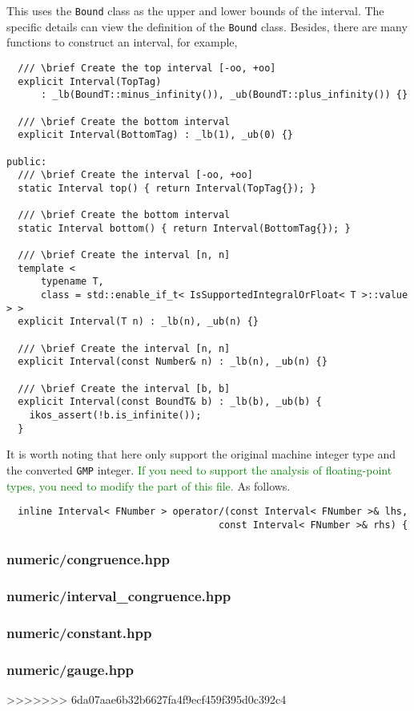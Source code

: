 \documentclass[12pt]{article}
\begin{document}
This uses the \texttt{Bound} class as the upper and lower bounds of the interval. The specific details can view the definition of the \texttt{Bound} class. Besides, there are many functions to construct an interval, for example,
\begin{lstlisting}
  /// \brief Create the top interval [-oo, +oo]
  explicit Interval(TopTag)
      : _lb(BoundT::minus_infinity()), _ub(BoundT::plus_infinity()) {}

  /// \brief Create the bottom interval
  explicit Interval(BottomTag) : _lb(1), _ub(0) {}

public:
  /// \brief Create the interval [-oo, +oo]
  static Interval top() { return Interval(TopTag{}); }

  /// \brief Create the bottom interval
  static Interval bottom() { return Interval(BottomTag{}); }

  /// \brief Create the interval [n, n]
  template <
      typename T,
      class = std::enable_if_t< IsSupportedIntegralOrFloat< T >::value > >
  explicit Interval(T n) : _lb(n), _ub(n) {}

  /// \brief Create the interval [n, n]
  explicit Interval(const Number& n) : _lb(n), _ub(n) {}

  /// \brief Create the interval [b, b]
  explicit Interval(const BoundT& b) : _lb(b), _ub(b) {
    ikos_assert(!b.is_infinite());
  }
\end{lstlisting}

It is worth noting that here only support the original machine integer type and the converted \texttt{GMP} integer. \textcolor{green}{If you need to support the analysis of floating-point types, you need to modify the part of this file.} As follows.
\begin{lstlisting}
  inline Interval< FNumber > operator/(const Interval< FNumber >& lhs,
                                     const Interval< FNumber >& rhs) {
\end{lstlisting}

\subsubsection{numeric/congruence.hpp}

\subsubsection{numeric/interval\_congruence.hpp}

\subsubsection{numeric/constant.hpp}

\subsubsection{numeric/gauge.hpp}





















>>>>>>> 6da07aae6b32b6627fa4f9ecf459f395d0c392c4
\end{document}
